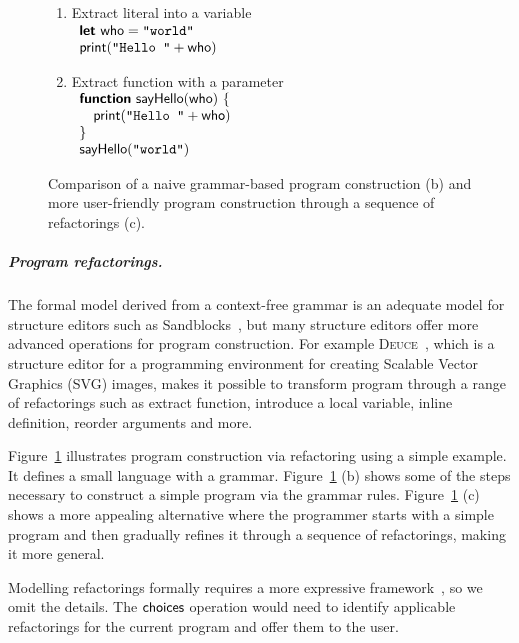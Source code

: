 \documentclass[anonymous, a4paper,UKenglish,cleveref, autoref, thm-restate]{lipics-v2021}
\newcommand{\ident}[1]{\textsf{#1}}
\newcommand{\kvd}[1]{\textsf{\bfseries #1}}
\newcommand{\choices}{\textnormal{\ident{choices}}}
\begin{document}
\begin{figure}[t]
\begin{minipage}[t]{.5\textwidth}
\begin{enumerate}
\item Extract literal into a variable\\[0.75em]
  $\begin{array}{l}
  \kvd{let}~\ident{who} = \texttt{''world''}\\
  \ident{print}(\texttt{''Hello ''} + \ident{who})
  \end{array}$

\item Extract function with a parameter\\[0.75em]
  $\begin{array}{l}
  \kvd{function}~\ident{sayHello}(\ident{who})~\{\\
  \quad\ident{print}(\texttt{''Hello ''} + \ident{who})\\
  \}\\
  \ident{sayHello}(\texttt{''world''})
  \end{array}$

\end{enumerate}
\end{minipage}
\caption{Comparison of a naive grammar-based program construction (b) and more user-friendly
  program construction through a sequence of refactorings (c).}
\label{fig:grammar}
\end{figure}

\subparagraph{Program refactorings.}
The formal model derived from a context-free grammar is an adequate model for structure
editors such as Sandblocks~\cite{beckmann-2023-all}, but many structure editors offer more
advanced operations for program construction. For example \textsc{Deuce}~\cite{hempel-2018-deuce},
which is a structure editor for a programming environment for creating Scalable
Vector Graphics (SVG) images, makes it possible to transform program through
a range of refactorings such as extract function, introduce a local variable, inline definition,
reorder arguments and more.

Figure~\ref{fig:grammar} illustrates program construction via refactoring using a simple
example. It defines a small language with a grammar. Figure~\ref{fig:grammar} (b) shows some
of the steps necessary to construct a simple program via the grammar rules.
Figure~\ref{fig:grammar} (c) shows a more appealing alternative where the programmer starts
with a simple program and then gradually refines it through a sequence of refactorings,
making it more general.

Modelling refactorings formally requires a more expressive framework~\cite{steimann-2011-refactoring},
so we omit the details. The $\choices$ operation would need to identify applicable refactorings
for the current program and offer them to the user.
\end{document}
